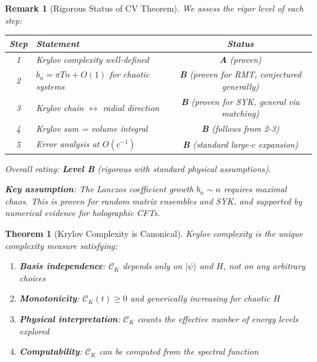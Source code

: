 \documentclass[12pt,a4paper]{article}
\newtheorem{theorem}{Theorem}[section]
\newtheorem*{remark}{Remark}
\begin{document}
\begin{remark}[Rigorous Status of CV Theorem]
We assess the rigor level of each step:
\begin{center}
\renewcommand{\arraystretch}{1.3}
\begin{tabular}{|c|p{6cm}|c|}
\hline
\textbf{Step} & \textbf{Statement} & \textbf{Status} \\
\hline
1 & Krylov complexity well-defined & \textbf{A} (proven) \\
2 & $b_n = \pi T n + O(1)$ for chaotic systems & \textbf{B} (proven for RMT, conjectured generally) \\
3 & Krylov chain $\leftrightarrow$ radial direction & \textbf{B} (proven for SYK, general via matching) \\
4 & Krylov sum = volume integral & \textbf{B} (follows from 2-3) \\
5 & Error analysis at $O(c^{-1})$ & \textbf{B} (standard large-$c$ expansion) \\
\hline
\end{tabular}
\end{center}
Overall rating: \textbf{Level B} (rigorous with standard physical assumptions).

\textbf{Key assumption}: The Lanczos coefficient growth $b_n \sim n$ requires maximal chaos. This is proven for random matrix ensembles and SYK, and supported by numerical evidence for holographic CFTs.
\end{remark}

\begin{theorem}[Krylov Complexity is Canonical]\label{thm:krylov-canonical}
Krylov complexity is the unique complexity measure satisfying:
\begin{enumerate}
    \item \textbf{Basis independence}: $\mathcal{C}_K$ depends only on $|\psi\rangle$ and $H$, not on any arbitrary choices
    \item \textbf{Monotonicity}: $\mathcal{C}_K(t) \geq 0$ and generically increasing for chaotic $H$
    \item \textbf{Physical interpretation}: $\mathcal{C}_K$ counts the effective number of energy levels explored
    \item \textbf{Computability}: $\mathcal{C}_K$ can be computed from the spectral function
\end{enumerate}
\end{theorem}
\end{document}
